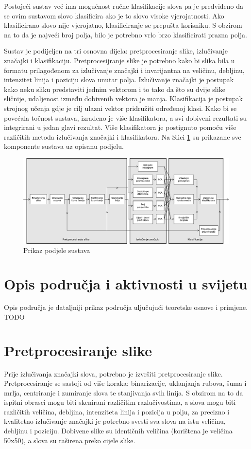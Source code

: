 \documentclass[a4paper,twocolumn,dvipdfm]{article}
\begin{document}
Postojeći sustav već ima mogućnost ručne klasifikacije slova pa je predviđeno
da se ovim sustavom slovo klasificira ako je to slovo visoke vjerojatnosti. Ako
klasificirano slovo nije vjerojatno, klasificiranje se prepušta korisniku. S
obzirom na to da je najveći broj polja, bilo je potrebno vrlo brzo klasificirati
prazna polja.

Sustav je podijeljen na tri osnovna dijela: pretprocesiranje slike, izlučivanje
značajki i klasifikaciju. Pretprocesijranje slike je potrebno kako bi slika bila
u formatu prilagođenom za izlučivanje značajki i invarijantna na veličinu,
debljinu, intenzitet linija i poziciju slova unutar polja. Izlučivanje značajki
je postupak kako neku sliku predstaviti jednim vektorom i to tako da što su
dvije slike sličnije, udaljenost između dobivenih vektora je manja.
Klasifikacija je postupak strojnog učenja gdje je cilj ulazni vektor pridružiti
određenoj klasi. Kako bi se povećala točnost sustava, izrađeno je više
klasifikatora, a svi dobiveni rezultati su integrirani u jedan glavi rezultat.
Više klasifikatora je postignuto pomoću više različitih metoda izlučivanja
značajki i klasifikatora. Na Slici \ref{figure:cijeliSustav} su prikazane sve
komponente sustava uz opisanu podjelu.

\begin{figure}
\centering
\includegraphics[width=\textwidth]{Diagram1.eps}
\caption{Prikaz podjele sustava}
\label{figure:cijeliSustav}
\end{figure}

\section{Opis područja i aktivnosti u svijetu}
Opis područja je dataljniji prikaz područja uljučujući teoretske osnove i
primjene. TODO \cite{vamvakasoptical}

\section{Pretprocesiranje slike}
Prije izlučivanja značajki slova, potrebno je izvršiti pretprocesiranje slike.
Pretprocesiranje se sastoji od više koraka: binarizacije, uklanjanja rubova,
šuma i mrlja, centriranje i zumiranje slova te stanjivanja svih linija. S
obzirom na to da ispitni obrasci mogu biti skenirani različitim razlučivostima,
a slova mogu biti različitih veličina, debljina, intenziteta linija i pozicija u
polju, za precizno i kvalitetno izlučivanje značajki je potrebno svesti sva
slova na istu veličinu, debljinu i poziciju. Dobivene slike su identičnih
veličina (korištena je veličina 50x50), a slova su raširena preko cijele slike.
\end{document}
